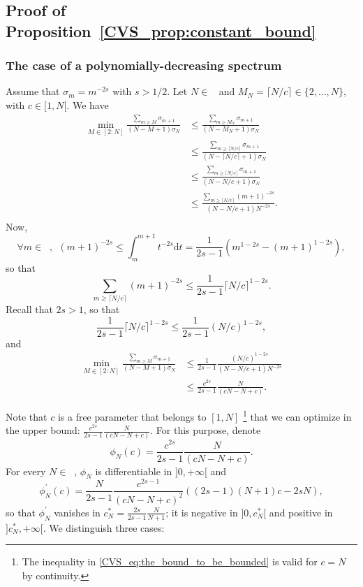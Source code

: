 \documentclass[twoside,11pt]{book}
\numberwithin{theorem}{chapter}
\numberwithin{definition}{chapter}
\numberwithin{proposition}{chapter}
\numberwithin{corollary}{chapter}
\numberwithin{example}{chapter}
\numberwithin{lemma}{chapter}
\numberwithin{assumption}{chapter}
\DeclareMathOperator{\Ns}{\mathbb{N}^{*}}
\begin{document}
\subsection{Proof of Proposition~\ref{CVS_prop:constant_bound}}
\subsubsection{The case of a polynomially-decreasing spectrum}
Assume that $\sigma_{m} = m^{-2s}$ with $s>1/2$.
Let $N \in \Ns$ and $M_{N} = \lceil{N/c \rceil} \in \{2,\dots,N\}$, with $c \in [1,N[$.
We have
\begin{align}
\min_{M \in [2:N]}\frac{\sum_{m \geq M} \sigma_{m+1}}{(N-M+1)\sigma_N} & \leq \frac{\sum_{m \geq M_N} \sigma_{m+1}}{(N-M_N+1)\sigma_N} \\
& \leq \frac{\sum_{m \geq \lceil{N/c\rceil}} \sigma_{m+1}}{(N-\lceil{N/c\rceil}+1)\sigma_N} \\
& \leq \frac{\sum_{m \geq \lceil{N/c\rceil}} \sigma_{m+1}}{(N-N/c+1)\sigma_N}\\
& \leq \frac{\sum_{m \geq \lceil{N/c\rceil}} (m+1)^{-2s}}{(N-N/c+1)N^{-2s}}.\\
\end{align}
Now,
\begin{equation}
\forall m \in \Ns, \:\: (m+1)^{-2s} \leq \int_{m}^{m+1}t^{-2s} \mathrm{d}t = \frac{1}{2s-1}(m^{1-2s}-(m+1)^{1-2s}),
\end{equation}
so that
\begin{equation}
\sum\limits_{m \geq \lceil{N/c\rceil}} (m+1)^{-2s} \leq \frac{1}{2s-1}\lceil{N/c\rceil}^{1-2s}.
\end{equation}
Recall that $2s>1$, so that
\begin{equation}
\frac{1}{2s-1}\lceil{N/c\rceil}^{1-2s} \leq \frac{1}{2s-1}(N/c)^{1-2s},
\end{equation}
and
\begin{align}
\min_{M \in [2:N]}\frac{\sum_{m \geq M} \sigma_{m+1}}{(N-M+1)\sigma_N}
& \leq \frac{1}{2s-1}\frac{(N/c)^{1-2s}}{(N-N/c+1)N^{-2s}}\\
& \leq \frac{c^{2s}}{2s-1}\frac{N}{(cN-N+c)} \label{CVS_eq:the_bound_to_be_bounded}.
\end{align}

Note that $c$ is a free parameter that belongs to $[1,N]$ \footnote{The inequality in \eqref{CVS_eq:the_bound_to_be_bounded} is valid for $c = N$ by continuity.} that we can optimize in the upper bound: $\frac{c^{2s}}{2s-1}\frac{N}{(cN-N+c)}$. For this purpose, denote
\begin{equation}
\phi_{N}(c) = \frac{c^{2s}}{2s-1}\frac{N}{(cN-N+c)}.
\end{equation}
For every $N \in \Ns$, $\phi_{N}$ is differentiable in $]0,+\infty[$ and
\begin{equation}
\phi_{N}^{'}(c) = \frac{N}{2s-1}\frac{c^{2s-1}}{(cN-N+c)^{2}} \left( (2s-1)(N+1) c - 2s N \right),
\end{equation}
so that $\phi_{N}^{'}$ vanishes in $c_{N}^{*} = \frac{2s}{2s-1} \frac{N}{N+1}$; it is negative in $]0,c_{N}^{*}[$ and positive in $]c_{N}^{*}, +\infty[$. We distinguish three cases:
\end{document}
